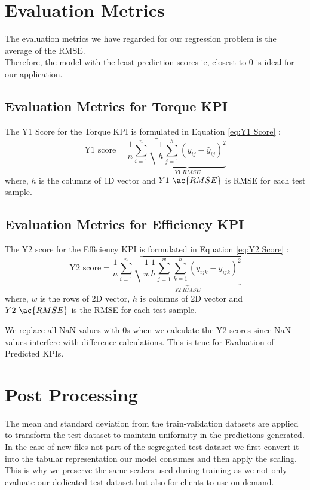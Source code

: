 \documentclass{report} %
\begin{document}
\section{Evaluation Metrics}
The evaluation metrics we have regarded for our regression problem is the average of the \ac{RMSE}. \\
Therefore, the model with the least prediction scores ie, closest to 0 is ideal for our application. \\

\subsection{Evaluation Metrics for Torque \ac{KPI}}\label{sec:Evaluation Metrics for 2D KPI}
The Y1 Score for the Torque \ac{KPI} is formulated in Equation \ref{eq:Y1 Score} :
\begin{equation}
\text{Y1 score} = \frac{1}{n} \sum_{i=1}^{n} \underbrace{ \sqrt{\frac{1}{h} \sum_{j=1}^{h} (y_{ij} - \hat{y}_{ij})^2}}_{Y1\ RMSE}
\label{eq:Y1 Score}
\end{equation}
where, \(h\) is the columns of 1D vector and \(Y1\ \ac{RMSE}\) is \ac{RMSE} for each test sample.

\subsection{Evaluation Metrics for Efficiency \ac{KPI}}\label{sec:Evaluation Metrics for 3D KPI}
The Y2 score for the Efficiency \ac{KPI} is formulated in Equation \ref{eq:Y2 Score} :
\begin{equation}
    \text{Y2 score} = \frac{1}{n} \sum_{i=1}^{n} \underbrace{ \sqrt{\frac{1}{w} \frac{1}{h} \sum_{j=1}^{w} \sum_{k=1}^{h} (y_{ijk} - \hat{y}_{ijk})^2}}_{Y2\ RMSE}
    \label{eq:Y2 Score}
\end{equation}
where, \(w\) is the rows of 2\ac{D} vector, \(h\) is columns of 2\ac{D} vector and \(Y2\ \ac{RMSE}\) is the \ac{RMSE} for each test sample.

We replace all \ac{NaN} values with 0s when we calculate the Y2 scores since \ac{NaN} values interfere with difference calculations. This is true for Evaluation of Predicted \ac{KPI}s.

\section{Post Processing}\label{sec:Post Processing}
The mean and standard deviation from the train-validation datasets are applied to transform the test dataset to maintain uniformity in the predictions generated.
In the case of new files not part of the segregated test dataset we first convert it into the tabular representation our model consumes and then apply the scaling.\\
This is why we preserve the same scalers used during training as we not only evaluate our dedicated test dataset but also for clients to use on demand. 
\end{document}
